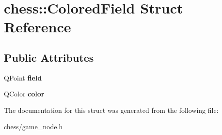 \hypertarget{structchess_1_1ColoredField}{\section{chess\-:\-:Colored\-Field Struct Reference}
\label{structchess_1_1ColoredField}
}
\subsection*{Public Attributes}
\begin{DoxyCompactItemize}
\item 
\hypertarget{structchess_1_1ColoredField_a0c12a1e026a0632a8db1d71589db868d}{Q\-Point {\bfseries field}}\label{structchess_1_1ColoredField_a0c12a1e026a0632a8db1d71589db868d}

\item 
\hypertarget{structchess_1_1ColoredField_a53c79707e30ca17947927a8debd1e797}{Q\-Color {\bfseries color}}\label{structchess_1_1ColoredField_a53c79707e30ca17947927a8debd1e797}

\end{DoxyCompactItemize}


The documentation for this struct was generated from the following file\-:\begin{DoxyCompactItemize}
\item 
chess/game\-\_\-node.\-h\end{DoxyCompactItemize}
